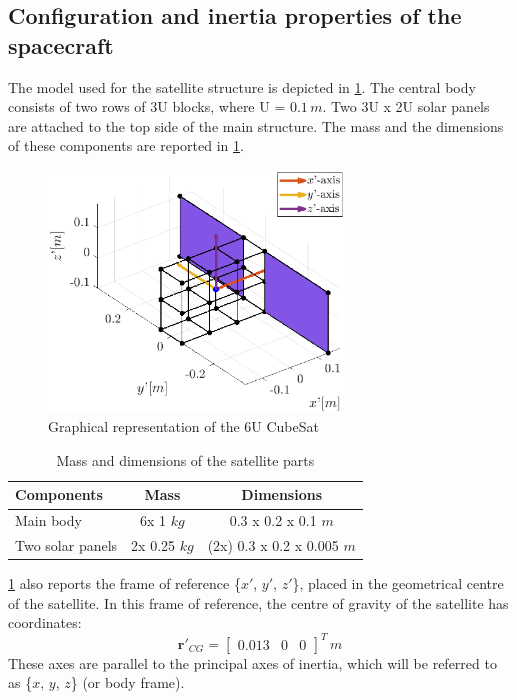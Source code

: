 \subsection{Configuration and inertia properties of the spacecraft}

The model used for the satellite structure is depicted in \cref{fig:cubesat}. The central body consists of two rows of 3U blocks, where U = $0.1 \,m$. Two 3U x 2U solar panels are attached to the top side of the main structure. The mass and the dimensions of these components are reported in \cref{tab:mass_dimensions}.

\begin{figure}[h]
    \centering
    \includegraphics[width=0.7\textwidth]{graphics/cubesat.eps}
    \caption{Graphical representation of the 6U CubeSat}
    \label{fig:cubesat}
\end{figure}

\begin{table}[h]
    \centering
    \caption{Mass and dimensions of the satellite parts}
    \begin{tabular}{lcc}
    \toprule
    \toprule
    \textbf{Components} & \textbf{Mass} & \textbf{Dimensions} \\
    \midrule
    Main body & 6x 1 $kg$ & 0.3 x 0.2 x 0.1 $m$ \\
    \midrule
    Two solar panels & 2x 0.25 $kg$ & (2x) 0.3 x 0.2 x 0.005 $m$ \\
    \bottomrule
    \bottomrule
    \end{tabular}
    \label{tab:mass_dimensions}
\end{table}

\cref{fig:cubesat} also reports the frame of reference \{$x'$, $y'$, $z'$\}, placed in the geometrical centre of the satellite. In this frame of reference, the centre of gravity of the satellite has coordinates: $$ \mathbf{r}'_{CG} = \begin{bmatrix} 0.013 & 0 & 0 \end{bmatrix}^T\, m $$ These axes are parallel to the principal axes of inertia, which will be referred to as \{$x$, $y$, $z$\} (or body frame).

